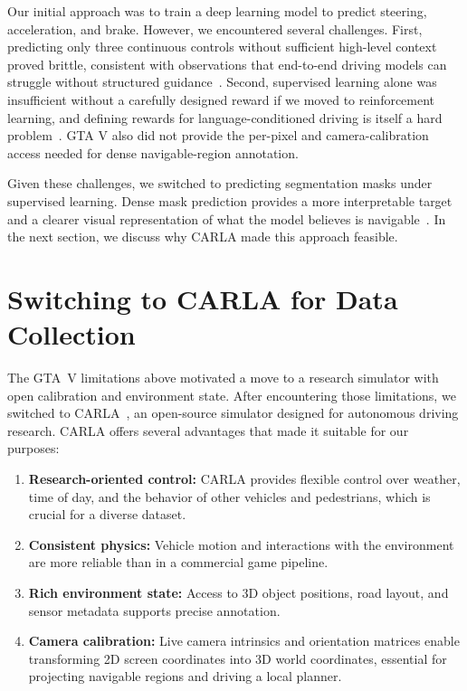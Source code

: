 Our initial approach was to train a deep learning model to predict steering, acceleration, and brake. However, we encountered several challenges. First, predicting only three continuous controls without sufficient high-level context proved brittle, consistent with observations that end-to-end driving models can struggle without structured guidance~\cite{bansal2018chauffeurnet,Codevilla_Muller_Lopez_Koltun_Dosovitskiy_2018}. Second, supervised learning alone was insufficient without a carefully designed reward if we moved to reinforcement learning, and defining rewards for language-conditioned driving is itself a hard problem~\cite{sutton2018reinforcement,hadfieldmenell2017inverse}. GTA V also did not provide the per-pixel and camera-calibration access needed for dense navigable-region annotation.

Given these challenges, we switched to predicting segmentation masks under supervised learning. Dense mask prediction provides a more interpretable target and a clearer visual representation of what the model believes is navigable~\cite{uricar2021desoiling,hanselmann2022king}. In the next section, we discuss why CARLA made this approach feasible.

\section{Switching to CARLA for Data Collection}

The GTA~V limitations above motivated a move to a research simulator with open calibration and environment state. After encountering those limitations, we switched to CARLA~\cite{dosovitskiy2017carla}, an open-source simulator designed for autonomous driving research. CARLA offers several advantages that made it suitable for our purposes:

\begin{enumerate}
    \item \textbf{Research-oriented control:} CARLA provides flexible control over weather, time of day, and the behavior of other vehicles and pedestrians, which is crucial for a diverse dataset.
    \item \textbf{Consistent physics:} Vehicle motion and interactions with the environment are more reliable than in a commercial game pipeline.
    \item \textbf{Rich environment state:} Access to 3D object positions, road layout, and sensor metadata supports precise annotation.
    \item \textbf{Camera calibration:} Live camera intrinsics and orientation matrices enable transforming 2D screen coordinates into 3D world coordinates, essential for projecting navigable regions and driving a local planner.
\end{enumerate}

